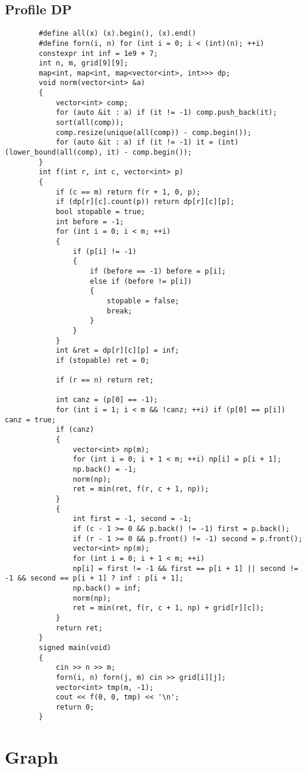 \documentclass[landscape, 8pt, a4paper, oneside, twocolumn]{extarticle}
\begin{document}
	\subsection {Profile DP}
	\begin{verbatim}
		#define all(x) (x).begin(), (x).end()
		#define forn(i, n) for (int i = 0; i < (int)(n); ++i)
		constexpr int inf = 1e9 + 7;
		int n, m, grid[9][9];
		map<int, map<int, map<vector<int>, int>>> dp;
		void norm(vector<int> &a)
		{
			vector<int> comp;
			for (auto &it : a) if (it != -1) comp.push_back(it);
			sort(all(comp));
			comp.resize(unique(all(comp)) - comp.begin());
			for (auto &it : a) if (it != -1) it = (int)(lower_bound(all(comp), it) - comp.begin());
		}
		int f(int r, int c, vector<int> p)
		{
			if (c == m) return f(r + 1, 0, p);
			if (dp[r][c].count(p)) return dp[r][c][p];
			bool stopable = true;
			int before = -1;
			for (int i = 0; i < m; ++i)
			{
				if (p[i] != -1)
				{
					if (before == -1) before = p[i];
					else if (before != p[i])
					{
						stopable = false;
						break;
					}
				}
			}
			int &ret = dp[r][c][p] = inf;
			if (stopable) ret = 0;
			
			if (r == n) return ret;
			
			int canz = (p[0] == -1);
			for (int i = 1; i < m && !canz; ++i) if (p[0] == p[i]) canz = true;
			if (canz)
			{
				vector<int> np(m);
				for (int i = 0; i + 1 < m; ++i) np[i] = p[i + 1];
				np.back() = -1;
				norm(np);
				ret = min(ret, f(r, c + 1, np));
			}
			{
				int first = -1, second = -1;
				if (c - 1 >= 0 && p.back() != -1) first = p.back();
				if (r - 1 >= 0 && p.front() != -1) second = p.front();
				vector<int> np(m);
				for (int i = 0; i + 1 < m; ++i)
				np[i] = first != -1 && first == p[i + 1] || second != -1 && second == p[i + 1] ? inf : p[i + 1];
				np.back() = inf;
				norm(np);
				ret = min(ret, f(r, c + 1, np) + grid[r][c]);
			}
			return ret;
		}
		signed main(void)
		{
			cin >> n >> m;
			forn(i, n) forn(j, m) cin >> grid[i][j];
			vector<int> tmp(m, -1);
			cout << f(0, 0, tmp) << '\n';
			return 0;
		}
	\end{verbatim}
	\section{Graph}
\end{document}

